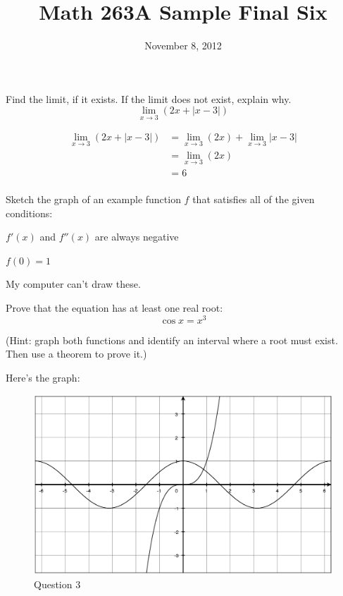 \documentclass[fleqn,addpoints]{exam}
\title{Math 263A Sample Final Six}
\date{November 8, 2012}
\author{}
\begin{document}

\maketitle  

\begin{questions}

\question
Find the limit, if it exists. If the limit does not exist, explain why. 
\[
  \lim_{x \to 3} (2x + |x - 3|)
\]

\begin{solution}
\begin{align*}
  \lim_{x \to 3} (2x + |x - 3|) &= \lim_{x \to 3} (2x)  + \lim_{x \to 3} |x - 3| \\
  &= \lim_{x \to 3} (2x) \\
  &= 6 \\
\end{align*}
\end{solution}

\question Sketch the graph of an example function $f$ that satisfies all of the given conditions: 
\begin{itemize*}
  \item $f'(x)$ and $f''(x)$ are always negative 
  \item $f(0) = 1$
\end{itemize*}

\begin{solution}
  My computer can't draw these.
\end{solution}

\ifprintanswers
\pagebreak
\fi

\question
Prove that the equation has at least one real root: 
\[
  \cos x = x^3
\]

(Hint: graph both functions and identify an interval where a root must exist. Then use a theorem to prove it.)

\begin{solution}
Here's the graph:
\begin{figure}[H]
  \centering
  \includegraphics[scale=.3]{final_6_q3.eps}
  \caption*{Question 3}
\end{figure}


\end{solution}
\end{questions}
\end{document}
